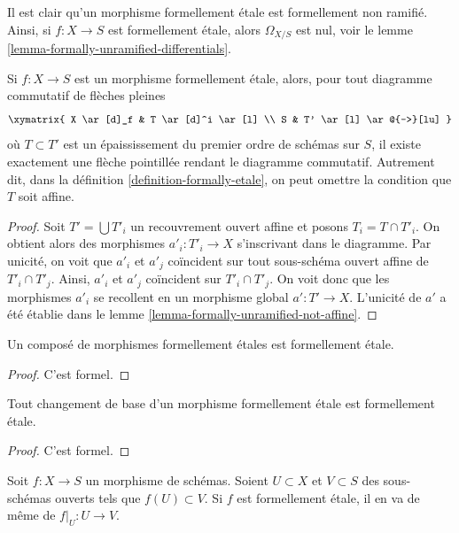 \noindent
Il est clair qu'un morphisme formellement étale est formellement non ramifié.
Ainsi, si $f : X \to S$ est formellement étale, alors $\Omega_{X/S}$ est nul, voir
le lemme \ref{lemma-formally-unramified-differentials}.

\begin{lemma}
\label{lemma-formally-etale-not-affine}
Si $f : X \to S$ est un morphisme formellement étale, alors, pour
tout diagramme commutatif de flèches pleines
$$
\xymatrix{
X \ar[d]_f & T \ar[d]^i \ar[l] \\
S & T' \ar[l] \ar@{-->}[lu]
}
$$
où $T \subset T'$ est un épaississement du premier ordre de schémas sur $S$,
il existe exactement une flèche pointillée rendant le diagramme commutatif.
Autrement dit, dans
la définition \ref{definition-formally-etale},
on peut omettre la condition que $T$ soit affine.
\end{lemma}

\begin{proof}
Soit $T' = \bigcup T'_i$ un recouvrement ouvert affine et posons
$T_i = T \cap T'_i$. On obtient alors des morphismes $a'_i : T'_i \to X$ s'inscrivant
dans le diagramme. Par unicité, on voit que $a'_i$ et $a'_j$ coïncident sur
tout sous-schéma ouvert affine de $T'_i \cap T'_j$. Ainsi, $a'_i$ et
$a'_j$ coïncident sur $T'_i \cap T'_j$. On voit donc que les morphismes $a'_i$
se recollent en un morphisme global $a' : T' \to X$. L'unicité de
$a'$ a été établie dans
le lemme \ref{lemma-formally-unramified-not-affine}.
\end{proof}

\begin{lemma}
\label{lemma-composition-formally-etale}
Un composé de morphismes formellement étales est formellement étale.
\end{lemma}

\begin{proof}
C'est formel.
\end{proof}

\begin{lemma}
\label{lemma-base-change-formally-etale}
Tout changement de base d'un morphisme formellement étale est formellement étale.
\end{lemma}

\begin{proof}
C'est formel.
\end{proof}

\begin{lemma}
\label{lemma-formally-etale-on-opens}
Soit $f : X \to S$ un morphisme de schémas.
Soient $U \subset X$ et $V \subset S$ des sous-schémas ouverts tels que
$f(U) \subset V$. Si $f$ est formellement étale, il en va de même de $f|_U : U \to V$.
\end{lemma}


